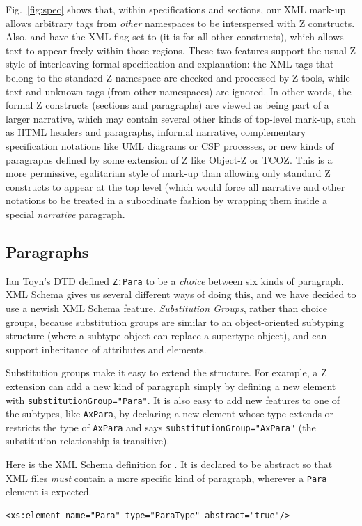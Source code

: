 \documentclass{llncs}  %
\begin{document}
Fig.~\ref{fig:spec} shows that, within specifications and sections, our XML
mark-up allows arbitrary tags from \emph{other} namespaces to be
interspersed with Z constructs.  
Also,  and  have the XML
 flag set to  (it is  for all other
constructs), which allows text to appear freely within those regions.
These two features support the usual Z style of interleaving formal
specification and explanation: the XML tags that belong to the standard Z
namespace are checked and processed by Z tools, while text and unknown tags
(from other namespaces) are ignored.  In other words, the formal Z
constructs (sections and paragraphs) are viewed as being part of a
larger narrative, which may contain several
other kinds of top-level mark-up, such as HTML headers and paragraphs,
informal narrative, complementary specification notations like UML diagrams
or CSP processes, or new kinds of paragraphs defined by some extension of Z
like Object-Z or TCOZ.  This is a more permissive, egalitarian style of
mark-up than allowing only standard Z constructs to appear at the top level
(which would force all narrative and other notations to be treated in a
subordinate fashion by wrapping them inside a special \emph{narrative}
paragraph.


\subsection{Paragraphs}

Ian Toyn's DTD defined \verb!Z:Para! to be a \emph{choice} between six
kinds of paragraph.  XML Schema gives us several different ways of doing
this, and we have decided to use a newish XML Schema feature,
\emph{Substitution Groups}, rather than choice groups, because substitution
groups are similar to an object-oriented subtyping structure (where a
subtype object can replace a supertype object), and can support inheritance
of attributes and elements.   

Substitution groups make it easy to extend the structure.  For example, a Z
extension can add a new kind of paragraph simply by defining a new
element with \texttt{substitutionGroup="Para"}.  It is also easy to add new
features to one of the subtypes, like \texttt{AxPara}, by declaring a new
element whose type extends or restricts the type of \texttt{AxPara} and
says \texttt{substitutionGroup="AxPara"} (the substitution relationship is
transitive).

Here is the XML Schema definition for .
It is declared to be abstract so that XML files \emph{must} contain a
more specific kind of paragraph, wherever a \texttt{Para} element is 
expected.
\begin{verbatim}
<xs:element name="Para" type="ParaType" abstract="true"/>
\end{verbatim}
\end{document}
